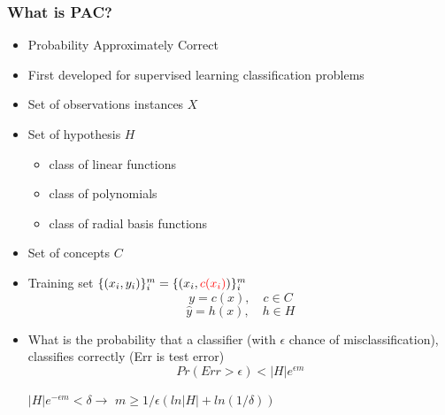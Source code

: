 \documentclass{beamer}
\newcommand{\tc}[2]{\textcolor{#1}{#2}}
\newcommand{\tcr}[1]{\tc{red}{#1}}
\begin{document}
\begin{frame}
	\frametitle{What is PAC?}
	\begin{itemize}
		\item Probability Approximately Correct
		\item First developed for supervised learning classification problems
		\item Set of observations instances $X$
		\item Set of hypothesis $H$
		\begin{itemize}
			\item class of linear functions
			\item class of polynomials
			\item class of radial basis functions
		\end{itemize}
		\item Set of concepts $C$
		\item Training set $\{ (x_i, y_i) \}_i^m = \{ (x_i, \tcr{c(x_i)}) \}_i^m$
		$$y = c(x), \quad c \in C $$
		$$\hat{y} = h(x), \quad h \in H $$



		\item What is the probability that a classifier (with $\epsilon$ chance of misclassification), classifies correctly (Err is test error)
		$$ Pr(Err > \epsilon) < |H|e^{\epsilon m} $$ 

		$|H|e^{-\epsilon m} < \delta \rightarrow$
		$m \geq 1/\epsilon (ln|H| + ln(1/\delta))$
	\end{itemize}
\end{frame}
\end{document}
